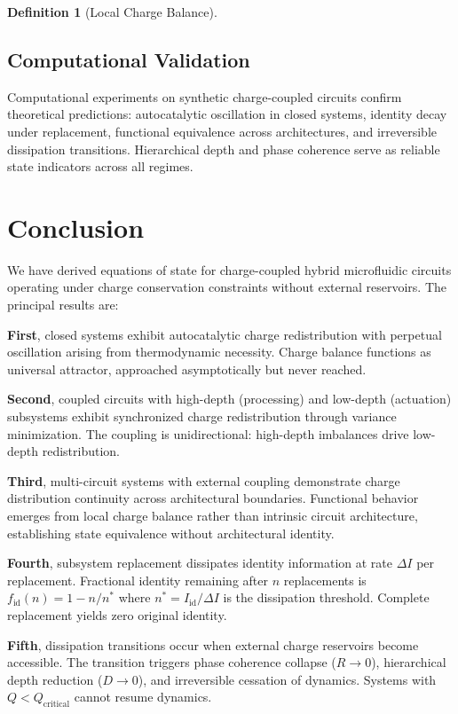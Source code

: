 \documentclass[12pt,a4paper]{article}
\theoremstyle{plain}
\theoremstyle{definition}
\newtheorem{definition}[theorem]{Definition}
\theoremstyle{remark}
\begin{document}
\begin{definition}[Local Charge Balance]
\subsection{Computational Validation}

Computational experiments on synthetic charge-coupled circuits confirm theoretical predictions: autocatalytic oscillation in closed systems, identity decay under replacement, functional equivalence across architectures, and irreversible dissipation transitions. Hierarchical depth and phase coherence serve as reliable state indicators across all regimes.

\section{Conclusion}
\label{sec:conclusion}

We have derived equations of state for charge-coupled hybrid microfluidic circuits operating under charge conservation constraints without external reservoirs. The principal results are:

\textbf{First}, closed systems exhibit autocatalytic charge redistribution with perpetual oscillation arising from thermodynamic necessity. Charge balance functions as universal attractor, approached asymptotically but never reached.

\textbf{Second}, coupled circuits with high-depth (processing) and low-depth (actuation) subsystems exhibit synchronized charge redistribution through variance minimization. The coupling is unidirectional: high-depth imbalances drive low-depth redistribution.

\textbf{Third}, multi-circuit systems with external coupling demonstrate charge distribution continuity across architectural boundaries. Functional behavior emerges from local charge balance rather than intrinsic circuit architecture, establishing state equivalence without architectural identity.

\textbf{Fourth}, subsystem replacement dissipates identity information at rate $\Delta I$ per replacement. Fractional identity remaining after $n$ replacements is $f_{\text{id}}(n) = 1 - n/n^*$ where $n^* = I_{\text{id}} / \Delta I$ is the dissipation threshold. Complete replacement yields zero original identity.

\textbf{Fifth}, dissipation transitions occur when external charge reservoirs become accessible. The transition triggers phase coherence collapse ($R \to 0$), hierarchical depth reduction ($D \to 0$), and irreversible cessation of dynamics. Systems with $Q < Q_{\text{critical}}$ cannot resume dynamics.


\end{definition}
\end{document}
